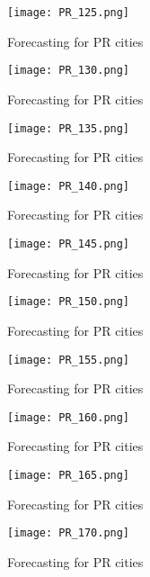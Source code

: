  \begin{figure}[!ht] 
 \centering 
 \texttt{[image: PR\_125.png]} 
 \caption{Forecasting for PR cities } 
 \label{fig:PR_125} 
 \end{figure} 
 
 \begin{figure}[!ht] 
 \centering 
 \texttt{[image: PR\_130.png]} 
 \caption{Forecasting for PR cities } 
 \label{fig:PR_130} 
 \end{figure} 
 
 \begin{figure}[!ht] 
 \centering 
 \texttt{[image: PR\_135.png]} 
 \caption{Forecasting for PR cities } 
 \label{fig:PR_135} 
 \end{figure} 
 
 \begin{figure}[!ht] 
 \centering 
 \texttt{[image: PR\_140.png]} 
 \caption{Forecasting for PR cities } 
 \label{fig:PR_140} 
 \end{figure} 
 
 \begin{figure}[!ht] 
 \centering 
 \texttt{[image: PR\_145.png]} 
 \caption{Forecasting for PR cities } 
 \label{fig:PR_145} 
 \end{figure} 
 
 \begin{figure}[!ht] 
 \centering 
 \texttt{[image: PR\_150.png]} 
 \caption{Forecasting for PR cities } 
 \label{fig:PR_150} 
 \end{figure} 
 
 \begin{figure}[!ht] 
 \centering 
 \texttt{[image: PR\_155.png]} 
 \caption{Forecasting for PR cities } 
 \label{fig:PR_155} 
 \end{figure} 
 
 \begin{figure}[!ht] 
 \centering 
 \texttt{[image: PR\_160.png]} 
 \caption{Forecasting for PR cities } 
 \label{fig:PR_160} 
 \end{figure} 
 
 \begin{figure}[!ht] 
 \centering 
 \texttt{[image: PR\_165.png]} 
 \caption{Forecasting for PR cities } 
 \label{fig:PR_165} 
 \end{figure} 
 
 \begin{figure}[!ht] 
 \centering 
 \texttt{[image: PR\_170.png]} 
 \caption{Forecasting for PR cities } 
 \label{fig:PR_170} 
 \end{figure} 
 
